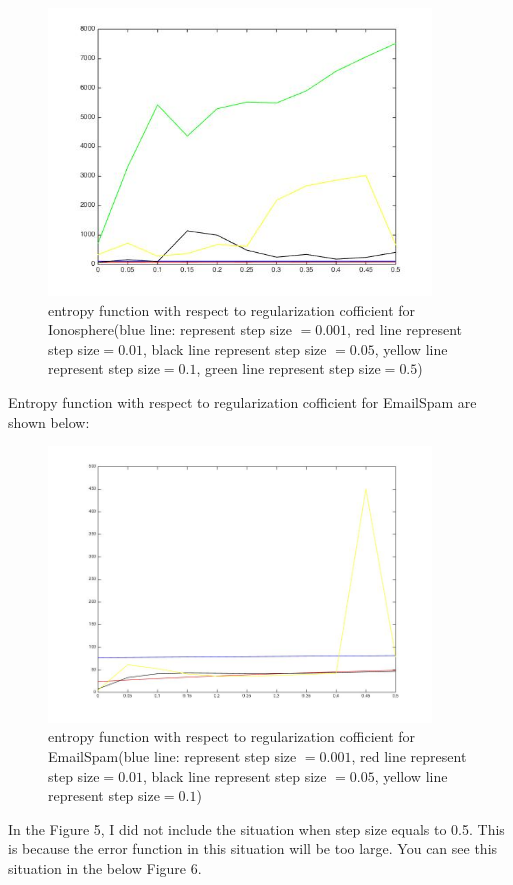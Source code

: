 \documentclass[11pt]{article}
\numberwithin{equation}{section}
\begin{document}
	\begin{figure} [H] 
	\centering
    	\includegraphics[width=4in]{Q5_2} 
    	\caption{entropy function with respect to regularization cofficient for Ionosphere(blue line: represent step size $=  0.001$, red line represent step size$ = 0.01$, black line represent step size $= 0.05$, yellow line represent step size$ = 0.1$, green line represent step size$ = 0.5$)} 
    	\label{fig:side:a} 
	\end{figure}
	
	Entropy function with respect to regularization  cofficient for EmailSpam are shown below:
	
	\begin{figure} [H] 
	\centering
    	\includegraphics[width=4in]{Q5_1} 
    	\caption{entropy function with respect to regularization cofficient for EmailSpam(blue line: represent step size $=  0.001$, red line represent step size$ = 0.01$, black line represent step size $= 0.05$, yellow line represent step size$ = 0.1$)} 
    	\label{fig:side:a} 
	\end{figure}
	
	In the Figure 5, I did not include the situation when step size equals to 0.5. This is because the error function in this situation will be too large. You can see this situation in the below Figure 6.
	
\end{document}
